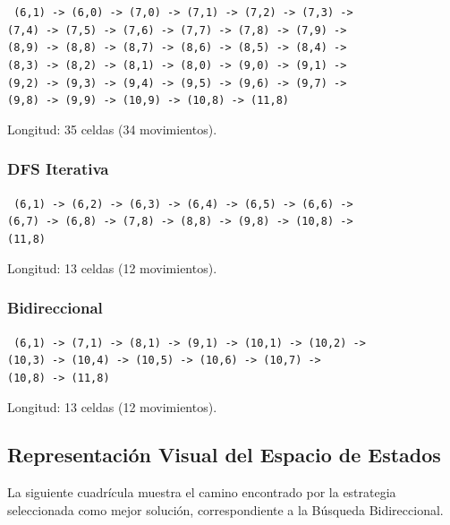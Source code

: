 \documentclass{article}
\begin{document}
\begin{flushleft}
\small
\texttt{
(6,1) -> (6,0) -> (7,0) -> (7,1) -> (7,2) -> (7,3) ->\\
(7,4) -> (7,5) -> (7,6) -> (7,7) -> (7,8) -> (7,9) ->\\
(8,9) -> (8,8) -> (8,7) -> (8,6) -> (8,5) -> (8,4) ->\\
(8,3) -> (8,2) -> (8,1) -> (8,0) -> (9,0) -> (9,1) ->\\
(9,2) -> (9,3) -> (9,4) -> (9,5) -> (9,6) -> (9,7) ->\\
(9,8) -> (9,9) -> (10,9) -> (10,8) -> (11,8)
}
\end{flushleft}

Longitud: 35 celdas (34 movimientos).

\subsubsection{DFS Iterativa}

\begin{flushleft}
\small
\texttt{
(6,1) -> (6,2) -> (6,3) -> (6,4) -> (6,5) -> (6,6) ->\\
(6,7) -> (6,8) -> (7,8) -> (8,8) -> (9,8) -> (10,8) ->\\
(11,8)
}
\end{flushleft}

Longitud: 13 celdas (12 movimientos).

\subsubsection{Bidireccional}

\begin{flushleft}
\small
\texttt{
(6,1) -> (7,1) -> (8,1) -> (9,1) -> (10,1) -> (10,2) ->\\
(10,3) -> (10,4) -> (10,5) -> (10,6) -> (10,7) ->\\
(10,8) -> (11,8)
}
\end{flushleft}

Longitud: 13 celdas (12 movimientos).


\subsection{Representación Visual del Espacio de Estados}

La siguiente cuadrícula muestra el camino encontrado por la
estrategia seleccionada como mejor solución, correspondiente a la
Búsqueda Bidireccional.
\end{document}
